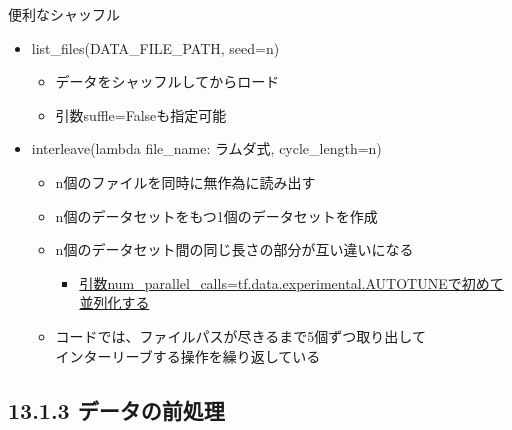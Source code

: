 \documentclass[aspectratio=169, dvipdfmx, 14pt, xcolor={svgnames,dvipsnames}, t]{beamer}
\begin{document}
\begin{frame}{便利なシャッフル}

  \begin{itemize}
    \tightlist
    \item
          list\_files(DATA\_FILE\_PATH, seed=n)

          \begin{itemize}
            \tightlist
            \item
                  \alert{データをシャッフルしてから}ロード
            \item
                  引数suffle=Falseも指定可能
          \end{itemize}
    \item
          interleave(lambda file\_name: ラムダ式, cycle\_length=n)

          \begin{itemize}
            \tightlist
            \item
                  \alert{n個のファイルを同時に無作為に読み出す}
            \item
                  n個のデータセットをもつ1個のデータセットを作成
            \item
                  n個のデータセット間の同じ長さの部分が\alert{互い違い}になる

                  \begin{itemize}
                    \tightlist
                    \item
                          \href{https://tensorflow.classcat.com/2019/03/23/tf20-alpha-guide-data-performance/}{引数num\_parallel\_calls=tf.data.experimental.AUTOTUNEで初めて並列化する}
                  \end{itemize}
            \item
                  コードでは、ファイルパスが尽きるまで5個ずつ取り出して\\
                  インターリーブする操作を繰り返している
          \end{itemize}
  \end{itemize}

\end{frame}


\hypertarget{ux30c7ux30fcux30bfux306eux524dux51e6ux7406}{%
  \subsection{13.1.3 データの前処理}\label{ux30c7ux30fcux30bfux306eux524dux51e6ux7406}}
\end{document}
